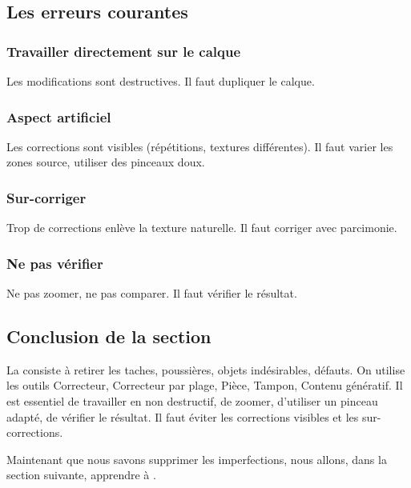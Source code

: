 \subsection{Les erreurs courantes}

\subsubsection{Travailler directement sur le calque}

Les modifications sont destructives. Il faut dupliquer le calque.

\subsubsection{Aspect artificiel}

Les corrections sont visibles (répétitions, textures différentes). Il faut varier les zones source, utiliser des pinceaux doux.

\subsubsection{Sur-corriger}

Trop de corrections enlève la texture naturelle. Il faut corriger avec parcimonie.

\subsubsection{Ne pas vérifier}

Ne pas zoomer, ne pas comparer. Il faut vérifier le résultat.

\subsection*{Conclusion de la section}

La  consiste à retirer les taches, poussières, objets indésirables, défauts. On utilise les outils Correcteur, Correcteur par plage, Pièce, Tampon, Contenu génératif. Il est essentiel de travailler en non destructif, de zoomer, d'utiliser un pinceau adapté, de vérifier le résultat. Il faut éviter les corrections visibles et les sur-corrections.

Maintenant que nous savons supprimer les imperfections, nous allons, dans la section suivante, apprendre à .


